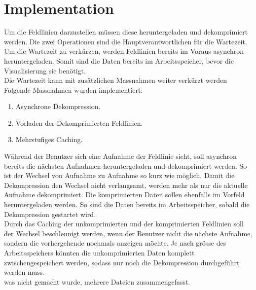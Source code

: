 \section{Implementation}
Um die Feldlinien darzustellen müssen diese heruntergeladen und dekomprimiert werden. Die zwei Operationen sind die Hauptverantwortlichen für die Wartezeit. Um die Wartezeit zu verkürzen, werden Feldlinien bereits im Voraus asynchron heruntergeladen. Somit sind die Daten bereits im Arbeitsspeicher, bevor die Visualisierung sie benötigt.\\
Die Wartezeit kann mit zusätzlichen Massnahmen weiter verkürzt werden Folgende Massnahmen wurden implementiert:
\begin{enumerate}
	\item Asynchrone Dekompression.
	\item Vorladen der Dekomprimierten Feldlinien.
	\item Mehrstufiges Caching.
\end{enumerate}
Während der Benutzer sich eine Aufnahme der Feldlinie sieht, soll asynchron bereits die nächsten Aufnahmen heruntergeladen und dekomprimiert werden. So ist der Wechsel von Aufnahme zu Aufnahme so kurz wie möglich. Damit die Dekompression den Wechsel nicht verlangsamt, werden mehr als nur die aktuelle Aufnahme dekomprimiert. Die komprimierten Daten sollen ebenfalls im Vorfeld heruntergeladen werden. So sind die Daten bereits im Arbeitsspeicher, sobald die Dekompression gestartet wird.\\
Durch das Caching der unkomprimierten und der komprimierten Feldlinien soll der Wechsel beschleunigt werden, wenn der Benutzer nicht die nächste Aufnahme, sondern die vorhergehende nochmals anzeigen möchte. Je nach grösse des Arbeitsspeichers könnten die unkomprimierten Daten komplett zwischengespeichert werden, sodass nur noch die Dekompression durchgeführt werden muss.\\
[\baselineskip]
was nicht gemacht wurde, mehrere Dateien zusammengefasst.

